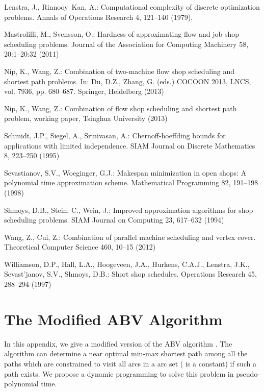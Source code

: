 \documentclass{llncs}
\makeatletter
\renewcommand{\appendix}{\par
\if@chapter@pp
\setcounter{chapter}{0}\setcounter{section}{0}\gdef\@chapapp{\appendixname}\gdef\thechapter{\@Alph\c@chapter}
\else
\setcounter{section}{0}\setcounter{subsection}{0}\gdef\thesection{Appendix \Alph{section}}
\fi
}
\numberwithin{subcase}{case}
\makeatother
\begin{document}
\begin{thebibliography}{10}
Lenstra, J., Rinnooy~Kan, A.: Computational complexity of discrete optimization
  problems. Annals of Operations Research  4,  121--140 (1979),

Mastrolilli, M., Svensson, O.: Hardness of approximating flow and job shop
  scheduling problems. Journal of the Association for Computing Machinery  58,  20:1--20:32 (2011)

Nip, K., Wang, Z.: Combination of two-machine flow shop scheduling and shortest
  path problems. In: Du, D.Z., Zhang, G. (eds.) COCOON 2013, LNCS, vol. 7936,
  pp. 680--687. Springer, Heidelberg (2013)

Nip, K., Wang, Z.: Combination of flow shop scheduling and shortest path problem,
  working paper, Tsinghua University (2013)

Schmidt, J.P., Siegel, A., Srinivasan, A.: Chernoff-hoeffding bounds for
  applications with limited independence. SIAM Journal on Discrete Mathematics
  8,  223--250 (1995)

Sevastianov, S.V., Woeginger, G.J.: Makespan minimization in open shops: A
  polynomial time approximation scheme. Mathematical Programming  82,  191--198
  (1998)

Shmoys, D.B., Stein, C., Wein, J.: Improved approximation algorithms for shop
  scheduling problems. SIAM Journal on Computing  23,  617--632 (1994)

Wang, Z., Cui, Z.: Combination of parallel machine scheduling and vertex cover.
  Theoretical Computer Science  460,  10--15 (2012)


Williamson, D.P., Hall, L.A., Hoogeveen, J.A., Hurkens, C.A.J., Lenstra, J.K.,
  Sevast'janov, S.V., Shmoys, D.B.: Short shop schedules. Operations Research
  45,  288--294 (1997)
\end{thebibliography}

\newpage
\appendix
\section{The Modified ABV Algorithm}\label{app_modABV}
In this appendix, we give a modified version of the ABV algorithm \cite{ABV06}. The algorithm can determine a near optimal min-max shortest path among all the paths which are constrained to visit all arcs in a arc set  ( is a constant) if such a path exists. We propose a dynamic programming to solve this problem in pseudo-polynomial time.
\end{document}
